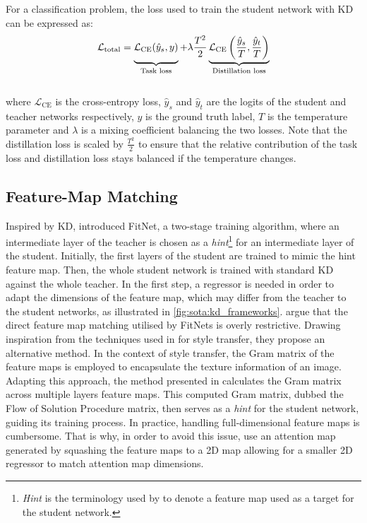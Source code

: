 For a classification problem, the loss used to train the student network with
\ac{KD} can be expressed as:\\

\begin{equation}
  \mathcal{L}_{\text{total}} = \underbrace{\mathcal{L}_{\text{CE}}(\hat{y}_{s}, y)\vphantom{\left(\frac{\hat{y}_{s}}{T}, \frac{\hat{y}_{t}}{T}\right)}}_{\text{Task loss}} +
  \lambda \frac{T^{2}}{2}\underbrace{\mathcal{L}_{\text{CE}}\left(\frac{\hat{y}_{s}}{T}, \frac{\hat{y}_{t}}{T}\right)}_{\text{Distillation loss}}
\end{equation}
\\

\noindent where $\mathcal{L}_{\text{CE}}$ is the cross-entropy loss,
$\hat{y}_{s}$ and $\hat{y}_{t}$ are the logits of the student and teacher
networks respectively, $y$ is the ground truth label, $T$ is the temperature
parameter and $\lambda$ is a mixing coefficient balancing the two losses. Note
that the distillation loss is scaled by $\frac{T^2}{2}$ to ensure that the
relative contribution of the task loss and distillation loss stays balanced if
the temperature changes.\\

\subsection{Feature-Map Matching}
Inspired by \ac{KD}, \cite{DBLP:journals/corr/RomeroBKCGB14} introduced FitNet,
a two-stage training algorithm, where an intermediate layer of the teacher is
chosen as a \emph{hint}\footnote{\emph{Hint} is the terminology used by
  \citeauthor{DBLP:journals/corr/RomeroBKCGB14}
  \cite{DBLP:journals/corr/RomeroBKCGB14} to denote a feature map used as a target
  for the student network.} for an intermediate layer of the student. Initially,
the first layers of the student are trained to mimic the hint feature map. Then,
the whole student network is trained with standard \ac{KD} against the whole
teacher. In the first step, a regressor is needed in order to adapt the
dimensions of the feature map, which may differ from the teacher to the student
networks, as illustrated in \cref{fig:sota:kd_frameworks}.
\citeauthor{DBLP:conf/cvpr/YimJBK17} argue that the direct feature map matching
utilised by FitNets is overly restrictive. Drawing inspiration from the
techniques used in \cite{DBLP:journals/corr/GatysEB15a} for style transfer, they
propose an alternative method. In the context of style transfer, the Gram matrix
of the feature maps is employed to encapsulate the texture information of an
image. Adapting this approach, the method presented in
\cite{DBLP:conf/cvpr/YimJBK17} calculates the Gram matrix across multiple layers
feature maps. This computed Gram matrix, dubbed the Flow of Solution Procedure
matrix, then serves as a \emph{hint} for the student network, guiding its
training process. In practice, handling full-dimensional feature maps is
cumbersome. That is why, in order to avoid this issue,
\cite{DBLP:conf/iclr/ZagoruykoK17} use an attention map generated by squashing
the feature maps to a 2D map allowing for a smaller 2D regressor to match
attention map dimensions.\\

